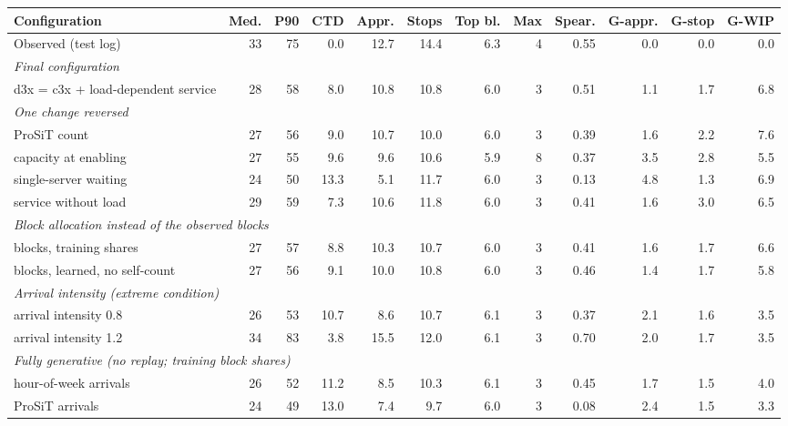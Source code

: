\begin{table}[htbp]
\centering
\scriptsize
\setlength{\tabcolsep}{2.4pt}
\begin{tabular}{lrrrrrrrrrrr}
\toprule
\textbf{Configuration} & \textbf{Med.} & \textbf{P90} & \textbf{CTD} & \textbf{Appr.} & \textbf{Stops} & \textbf{Top bl.} & \textbf{Max} & \textbf{Spear.} & \textbf{G-appr.} & \textbf{G-stop} & \textbf{G-WIP} \\
\midrule
Observed (test log) & 33 & 75 & 0.0 & 12.7 & 14.4 & 6.3 & 4 & 0.55 & 0.0 & 0.0 & 0.0 \\
\midrule
\multicolumn{12}{l}{\textit{Final configuration}} \\
d3x = c3x + load-dependent service & 28 & 58 & 8.0 & 10.8 & 10.8 & 6.0 & 3 & 0.51 & 1.1 & 1.7 & 6.8 \\
\midrule
\multicolumn{12}{l}{\textit{One change reversed}} \\
ProSiT count & 27 & 56 & 9.0 & 10.7 & 10.0 & 6.0 & 3 & 0.39 & 1.6 & 2.2 & 7.6 \\
capacity at enabling & 27 & 55 & 9.6 & 9.6 & 10.6 & 5.9 & 8 & 0.37 & 3.5 & 2.8 & 5.5 \\
single-server waiting & 24 & 50 & 13.3 & 5.1 & 11.7 & 6.0 & 3 & 0.13 & 4.8 & 1.3 & 6.9 \\
service without load & 29 & 59 & 7.3 & 10.6 & 11.8 & 6.0 & 3 & 0.41 & 1.6 & 3.0 & 6.5 \\
\midrule
\multicolumn{12}{l}{\textit{Block allocation instead of the observed blocks}} \\
blocks, training shares & 27 & 57 & 8.8 & 10.3 & 10.7 & 6.0 & 3 & 0.41 & 1.6 & 1.7 & 6.6 \\
blocks, learned, no self-count & 27 & 56 & 9.1 & 10.0 & 10.8 & 6.0 & 3 & 0.46 & 1.4 & 1.7 & 5.8 \\
\midrule
\multicolumn{12}{l}{\textit{Arrival intensity (extreme condition)}} \\
arrival intensity 0.8 & 26 & 53 & 10.7 & 8.6 & 10.7 & 6.1 & 3 & 0.37 & 2.1 & 1.6 & 3.5 \\
arrival intensity 1.2 & 34 & 83 & 3.8 & 15.5 & 12.0 & 6.1 & 3 & 0.70 & 2.0 & 1.7 & 3.5 \\
\midrule
\multicolumn{12}{l}{\textit{Fully generative (no replay; training block shares)}} \\
hour-of-week arrivals & 26 & 52 & 11.2 & 8.5 & 10.3 & 6.1 & 3 & 0.45 & 1.7 & 1.5 & 4.0 \\
ProSiT arrivals & 24 & 49 & 13.0 & 7.4 & 9.7 & 6.0 & 3 & 0.08 & 2.4 & 1.5 & 3.3 \\

\end{tabular}
\end{table}
